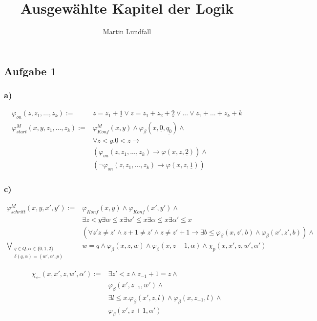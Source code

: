\documentclass[12pt]{article}
\begin{document}
\title{Ausgewählte Kapitel der Logik}
\author{Martin Lundfall}
\maketitle



\subsection*{Aufgabe 1}
\subsubsection*{a)}
\begin{align*}
  \varphi_{on}(z, z_1,...,z_k):=&z=z_1+\underline{1}\lor z = z_1 + z_2 + \underline{2} \lor ... \lor z_1 + ... +z_k + k \\
  \varphi_{start}^M(x,y,z_1,...,z_k) := &\varphi_{Konf}^M(x,y) \land
  \varphi_\beta(x,\underline{0},\underline{q_0}) \land \\
  &\forall z < y. \underline{0} < z \rightarrow  \\
  &(\varphi_{on}(z, z_1, ..., z_k) \rightarrow \varphi(x,z,\underline{2})) \land \\
  &(\neg\varphi_{on}(z, z_1, ..., z_k) \rightarrow \varphi(x,z,\underline{1}))
\end{align*}

\subsubsection*{c)}
\begin{align*}
  \varphi_{schritt}^M(x,y,x',y') :=& \varphi_{Konf}(x,y) \land \varphi_{Konf}(x',y') \land \\
  & \exists z < y \exists w \leq x \exists w' \leq x \exists \alpha \leq x \exists \alpha' \leq x\\
  &(\forall z' z\neq z'\land z+1\neq z'\land z\neq z'+1 \rightarrow \exists b\leq \varphi_\beta(x,z',b)\land\varphi_\beta(x',z',b))\land \\
  \bigvee_{\substack{q\in Q,\alpha\in\{\underline{0},\underline{1},\underline{2}\} \\ \delta(q,\alpha)=(w',\alpha',p)}} &
  w=q \land \varphi_\beta(x,z,w) \land \varphi_\beta(x,z+1,\alpha) \land \chi_p(x,x',z,w',\alpha')
\end{align*}

\begin{align*}
  \chi_{\leftarrow}(x,x',z,w',\alpha') := &\exists z'<z \land z_{-1} + 1 = z \land \\
  &\varphi_\beta(x', z_{-1}, w')  \land \\
  &\exists l\leq x.\varphi_\beta(x', z, l)\land \varphi_\beta(x, z_{-1}, l) \land \\
  &\varphi_\beta(x',z+1,\alpha') \\
\end{align*}
\end{document}
